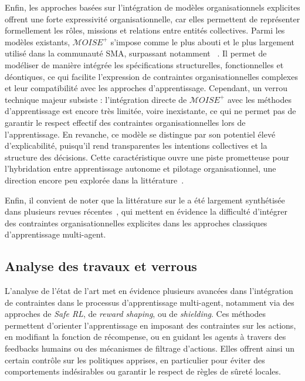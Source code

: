 Enfin, les approches basées sur l'intégration de modèles organisationnels explicites offrent une forte expressivité organisationnelle, car elles permettent de représenter formellement les rôles, missions et relations entre entités collectives. Parmi les modèles existants, $\mathcal{M}OISE^+$ s'impose comme le plus abouti et le plus largement utilisé dans la communauté SMA, surpassant notamment ~\cite{Ferber2004}. Il permet de modéliser de manière intégrée les spécifications structurelles, fonctionnelles et déontiques, ce qui facilite l'expression de contraintes organisationnelles complexes et leur compatibilité avec les approches d'apprentissage.
%
Cependant, un verrou technique majeur subsiste : l'intégration directe de $\mathcal{M}OISE^+$ avec les méthodes d'apprentissage est encore très limitée, voire inexistante, ce qui ne permet pas de garantir le respect effectif des contraintes organisationnelles lors de l'apprentissage. En revanche, ce modèle se distingue par son potentiel élevé d'explicabilité, puisqu'il rend transparentes les intentions collectives et la structure des décisions. Cette caractéristique ouvre une piste prometteuse pour l'hybridation entre apprentissage autonome et pilotage organisationnel, une direction encore peu explorée dans la littérature~\cite{bordini2006jade, chernova2014robot}.

\medskip

\noindent
Enfin, il convient de noter que la littérature sur le  a été largement synthétisée dans plusieurs revues récentes~\cite{Zhang2021, Papoudakis2021}, qui mettent en évidence la difficulté d'intégrer des contraintes organisationnelles explicites dans les approches classiques d'apprentissage multi-agent.

\subsection*{Analyse des travaux et verrous}

L'analyse de l'état de l'art met en évidence plusieurs avancées dans l'intégration de contraintes dans le processus d'apprentissage multi-agent, notamment via des approches de \textit{Safe RL}, de \textit{reward shaping}, ou de \textit{shielding}. Ces méthodes permettent d'orienter l'apprentissage en imposant des contraintes sur les actions, en modifiant la fonction de récompense, ou en guidant les agents à travers des feedbacks humains ou des mécanismes de filtrage d'actions. Elles offrent ainsi un certain contrôle sur les politiques apprises, en particulier pour éviter des comportements indésirables ou garantir le respect de règles de sûreté locales.

